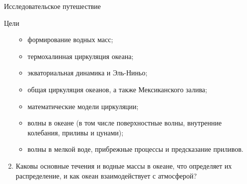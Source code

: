 \begin{chapter}{Исследовательское путешествие}
\begin{section}{Цели}
\begin{enumerate}
\begin{itemize}
  \item
  формирование водных масс;
%

  \item
  термохалинная циркуляция океана; 
%

  \item
  экваториальная динамика и Эль-Ниньо; 
%

  \item
  общая циркуляция океанов, а также Мексиканского залива; 

  \item
  математические модели циркуляции; 
%
  \item
  волны в океане (в том числе поверхностные волны, внутренние колебания, 
  приливы и цунами); 
%

  \item
  волны в мелкой воде, прибрежные процессы и предсказание приливов.
%
\end{itemize}

\item
Каковы основные течения и водные массы в океане, что определяет их 
распределение, и как океан взаимодействует с атмосферой?
%
\end{enumerate}
\end{section}


\end{chapter}
